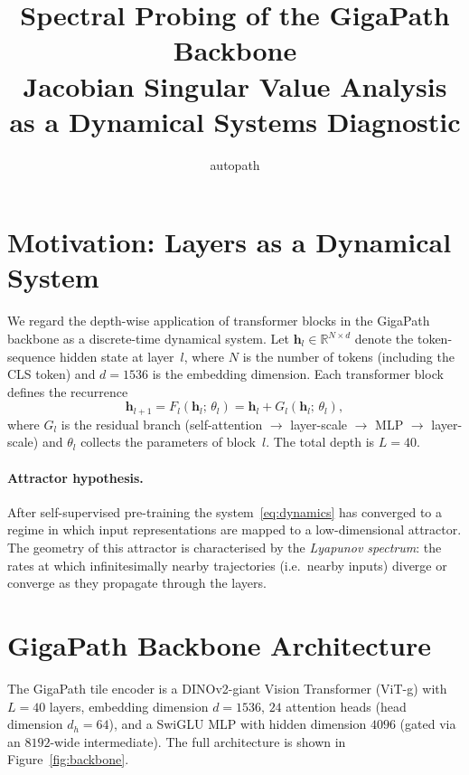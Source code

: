 \documentclass[11pt]{article}
\title{\textbf{Spectral Probing of the GigaPath Backbone}\\[4pt]
\large Jacobian Singular Value Analysis as a Dynamical Systems Diagnostic}
\author{autopath}
\date{}
\newcommand{\R}{\mathbb{R}}
\newcommand{\vect}[1]{\bm{#1}}
\begin{document}
\maketitle
\thispagestyle{empty}

\section{Motivation: Layers as a Dynamical System}

We regard the depth-wise application of transformer blocks in the GigaPath
backbone as a discrete-time dynamical system.  Let $\vect{h}_l \in \R^{N
\times d}$ denote the token-sequence hidden state at layer~$l$, where $N$
is the number of tokens (including the CLS token) and $d = 1536$ is the
embedding dimension.  Each transformer block defines the recurrence
\begin{equation}\label{eq:dynamics}
    \vect{h}_{l+1} = F_l(\vect{h}_l;\, \theta_l)
        = \vect{h}_l + G_l(\vect{h}_l;\, \theta_l),
\end{equation}
where $G_l$ is the residual branch (self-attention $\to$ layer-scale
$\to$ MLP $\to$ layer-scale) and $\theta_l$ collects the parameters of
block~$l$.  The total depth is $L = 40$.

\paragraph{Attractor hypothesis.}
After self-supervised pre-training the system~\eqref{eq:dynamics} has
converged to a regime in which input representations are mapped to a
low-dimensional attractor.  The geometry of this attractor is
characterised by the \emph{Lyapunov spectrum}: the rates at which
infinitesimally nearby trajectories (i.e.\ nearby inputs) diverge or
converge as they propagate through the layers.

\section{GigaPath Backbone Architecture}

The GigaPath tile encoder is a DINOv2-giant Vision Transformer (ViT-g)
with $L=40$ layers, embedding dimension $d=1536$, $24$ attention heads
(head dimension $d_h=64$), and a SwiGLU MLP with hidden dimension $4096$
(gated via an $8192$-wide intermediate).  The full architecture is shown
in Figure~\ref{fig:backbone}.
\end{document}
